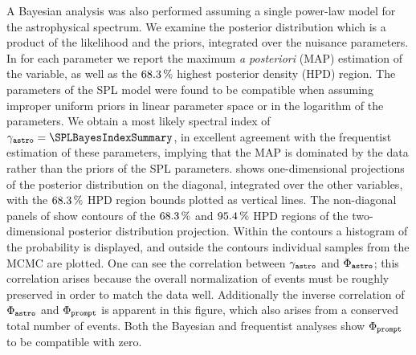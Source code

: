 A Bayesian analysis was also performed assuming a single power-law model for the astrophysical spectrum.
We examine the posterior distribution which is a product of the likelihood and the priors, integrated over the nuisance parameters.
In  for each parameter we report the maximum {\it{}a posteriori} (MAP) estimation of the variable, as well as the $\SI{68.3}\percent$ highest posterior density (HPD) region.
The parameters of the SPL model were found to be compatible when assuming improper uniform priors in linear parameter space or in the logarithm of the parameters.
We obtain a most likely spectral index of $\astrodeltagamma=\SPLBayesIndexSummary$, in excellent agreement with the frequentist estimation of these parameters, implying that the MAP is dominated by the data rather than the priors of the SPL parameters.
 shows one-dimensional projections of the posterior distribution on the diagonal, integrated over the other variables, with the $\SI{68.3}\percent$ HPD region bounds plotted as vertical lines.
The non-diagonal panels of  show contours of the $\SI{68.3}\percent$ and $\SI{95.4}\percent$ HPD regions of the two-dimensional posterior distribution projection.
Within the contours a histogram of the probability is displayed, and outside the contours individual samples from the MCMC are plotted.
One can see the correlation between $\gamma_\texttt{astro}$ and $\Phi_\texttt{astro}$; this correlation arises because the overall normalization of events must be roughly preserved in order to match the data well.
Additionally the inverse correlation of $\Phi_\texttt{astro}$ and $\Phi_\texttt{prompt}$ is apparent in this figure, which also arises from a conserved total number of events.
Both the Bayesian and frequentist analyses show $\Phi_\texttt{prompt}$ to be compatible with zero.

